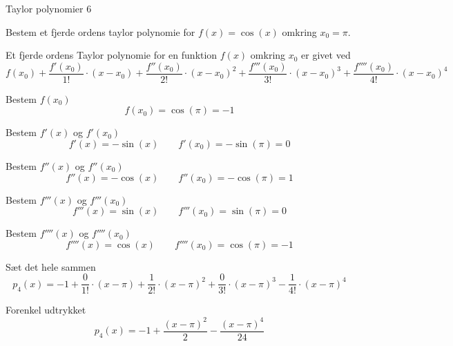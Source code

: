 \documentclass{article}
\begin{document}
\begin{exercise}{Taylor polynomier 6}

Bestem et fjerde ordens taylor polynomie for $f(x) = \cos(x)$
omkring $x_0 = \pi$.


\hint
Et fjerde ordens Taylor polynomie for en funktion $f(x)$
omkring $x_0$ er givet ved
\[
f(x_0) + \frac{f'(x_0)}{1!} \cdot (x - x_0)
+ \frac{f''(x_0)}{2!} \cdot (x - x_0)^2
+ \frac{f'''(x_0)}{3!} \cdot (x - x_0)^3
+ \frac{f''''(x_0)}{4!} \cdot (x - x_0)^4
\]


\hint
Bestem $f(x_0)$
\[
f(x_0) = \cos(\pi) = -1
\]

\hint
Bestem $f'(x)$ og $f'(x_0)$
\[
f'(x) = - \sin(x) \qquad f'(x_0)= - \sin(\pi) = 0
\]

\hint
Bestem $f''(x)$ og $f''(x_0)$
\[
f''(x) = - \cos(x) \qquad f''(x_0) = - \cos(\pi) = 1
\]

\hint
Bestem $f'''(x)$ og $f'''(x_0)$
\[
f'''(x) = \sin(x) \qquad f'''(x_0) = \sin(\pi) = 0
\]

\hint
Bestem $f''''(x)$ og $f''''(x_0)$
\[
f''''(x) = \cos(x) \qquad f''''(x_0) = \cos(\pi) = -1
\]

\hint
Sæt det hele sammen
\[
p_4(x) = -1 + \frac{0}{1!} \cdot (x - \pi) + \frac{1}{2!} \cdot (x - \pi)^2 + \frac{0}{3!} \cdot (x - \pi)^3 - \frac{1}{4!} \cdot (x - \pi)^4
\]

\hint
Forenkel udtrykket
\[
p_4(x) = -1 + \frac{(x - \pi)^2}{2} - \frac{(x - \pi)^4}{24}
\]


\end{exercise}
\end{document}
